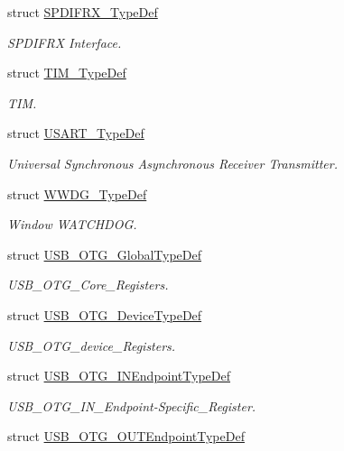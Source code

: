 \begin{DoxyCompactItemize}
struct \mbox{\hyperlink{struct_s_p_d_i_f_r_x___type_def}{S\+P\+D\+I\+F\+R\+X\+\_\+\+Type\+Def}}
\begin{DoxyCompactList}\small\item\em S\+P\+D\+I\+F\+RX Interface. \end{DoxyCompactList}\item 
struct \mbox{\hyperlink{struct_t_i_m___type_def}{T\+I\+M\+\_\+\+Type\+Def}}
\begin{DoxyCompactList}\small\item\em T\+IM. \end{DoxyCompactList}\item 
struct \mbox{\hyperlink{struct_u_s_a_r_t___type_def}{U\+S\+A\+R\+T\+\_\+\+Type\+Def}}
\begin{DoxyCompactList}\small\item\em Universal Synchronous Asynchronous Receiver Transmitter. \end{DoxyCompactList}\item 
struct \mbox{\hyperlink{struct_w_w_d_g___type_def}{W\+W\+D\+G\+\_\+\+Type\+Def}}
\begin{DoxyCompactList}\small\item\em Window W\+A\+T\+C\+H\+D\+OG. \end{DoxyCompactList}\item 
struct \mbox{\hyperlink{struct_u_s_b___o_t_g___global_type_def}{U\+S\+B\+\_\+\+O\+T\+G\+\_\+\+Global\+Type\+Def}}
\begin{DoxyCompactList}\small\item\em U\+S\+B\+\_\+\+O\+T\+G\+\_\+\+Core\+\_\+\+Registers. \end{DoxyCompactList}\item 
struct \mbox{\hyperlink{struct_u_s_b___o_t_g___device_type_def}{U\+S\+B\+\_\+\+O\+T\+G\+\_\+\+Device\+Type\+Def}}
\begin{DoxyCompactList}\small\item\em U\+S\+B\+\_\+\+O\+T\+G\+\_\+device\+\_\+\+Registers. \end{DoxyCompactList}\item 
struct \mbox{\hyperlink{struct_u_s_b___o_t_g___i_n_endpoint_type_def}{U\+S\+B\+\_\+\+O\+T\+G\+\_\+\+I\+N\+Endpoint\+Type\+Def}}
\begin{DoxyCompactList}\small\item\em U\+S\+B\+\_\+\+O\+T\+G\+\_\+\+I\+N\+\_\+\+Endpoint-\/\+Specific\+\_\+\+Register. \end{DoxyCompactList}\item 
struct \mbox{\hyperlink{struct_u_s_b___o_t_g___o_u_t_endpoint_type_def}{U\+S\+B\+\_\+\+O\+T\+G\+\_\+\+O\+U\+T\+Endpoint\+Type\+Def}}

\end{DoxyCompactItemize}
